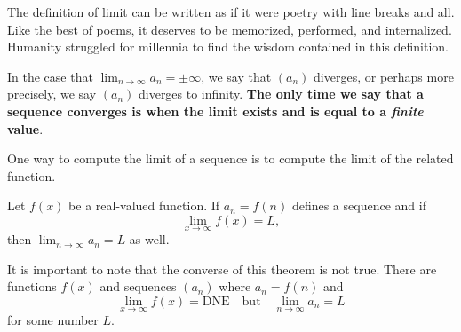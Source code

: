 \documentclass{ximera}
\begin{document}
\begin{question}
    \begin{multipleChoice}
    \end{multipleChoice}
    

  The definition of limit can be written as if it were poetry with
  line breaks and all.  Like the best of poems, it deserves to be
  memorized, performed, and internalized.  Humanity struggled for millennia
  to find the wisdom contained in this definition.
\end{question}

\begin{warning}
  In the case that $\lim_{n \to \infty} a_n = \pm\infty$, we say that
  $(a_n)$ diverges, or perhaps more precisely, we say $(a_n)$ diverges
  to infinity.  \textbf{The only time we say that a sequence converges
    is when the limit exists and is equal to a \textit{finite} value}.
\end{warning}


One way to compute the limit of a sequence is to compute the limit of
the related function.
\begin{theorem}
  Let $f(x)$ be a real-valued function.  If $a_n = f(n)$ defines a
  sequence and if
  \[
  \lim_{x\to\infty}f(x)=L,
  \]
  then $\lim_{n\to\infty} a_n=L$ as well.
\end{theorem}

\begin{warning}
It is important to note that the converse of this theorem is not
true. There are functions $f(x)$ and sequences $(a_n)$ where $a_n
=f(n)$ and
\[
\lim_{x\to\infty}f(x)=\text{DNE} \quad\text{but} \quad \lim_{n\to\infty} a_n = L
\]
for some number $L$.
\end{warning}
\end{document}
